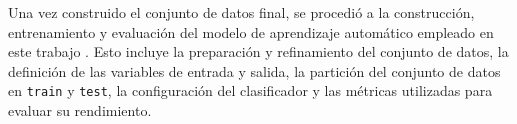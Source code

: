 Una vez construido el conjunto de datos final, se procedió a la construcción, entrenamiento y evaluación del modelo de aprendizaje automático empleado en este trabajo . Esto incluye la preparación y refinamiento del conjunto de datos, la definición de las variables de entrada y salida, la partición del conjunto de datos en \texttt{train} y \texttt{test}, la configuración del clasificador y las métricas utilizadas para evaluar su rendimiento.